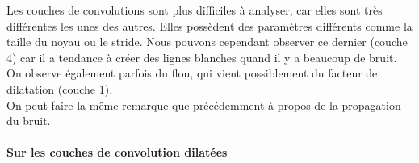 \documentclass[12pt]{article}
\begin{document}
Les couches de convolutions sont plus difficiles à analyser, car elles sont très différentes les unes des autres. Elles possèdent des paramètres différents comme la taille du noyau ou le stride. Nous pouvons cependant observer ce dernier (couche 4) car il a tendance à créer des lignes blanches quand il y a beaucoup de bruit. On observe également parfois du flou, qui vient possiblement du facteur de dilatation (couche 1).\\
On peut faire la même remarque que précédemment à propos de la propagation du bruit.

\paragraph{Sur les couches de convolution dilatées}\ \\
\begin{figure}[htb]
\centering
  \hfill
  \hfill
  \subfloat{%
}
\end{figure}
\end{document}
